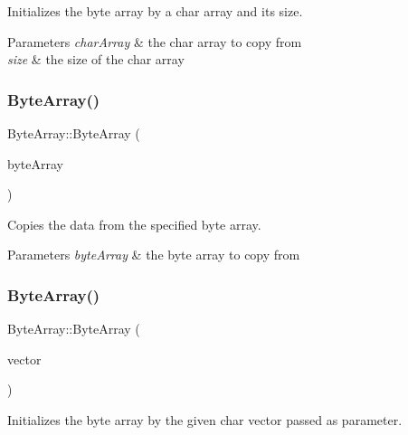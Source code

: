 Initializes the byte array by a char array and its size. 


\begin{DoxyParams}{Parameters}
{\em char\+Array} & the char array to copy from \\
\hline
{\em size} & the size of the char array \\
\hline
\end{DoxyParams}
\mbox{\label{class_byte_array_a6d8888512392eb9e671f56e434179fa1}} 
\subsubsection{\texorpdfstring{ByteArray()}{ByteArray()}\hspace{0.1cm}{\footnotesize\ttfamily [2/3]}}
{\footnotesize\ttfamily Byte\+Array\+::\+Byte\+Array (\begin{DoxyParamCaption}\item[{const \mbox{\hyperlink{class_byte_array}{Byte\+Array}} \&}]{byte\+Array }\end{DoxyParamCaption})}



Copies the data from the specified byte array. 


\begin{DoxyParams}{Parameters}
{\em byte\+Array} & the byte array to copy from \\
\hline
\end{DoxyParams}
\mbox{\label{class_byte_array_a94a65f2b5c6952713712e23a574b0295}} 
\subsubsection{\texorpdfstring{ByteArray()}{ByteArray()}\hspace{0.1cm}{\footnotesize\ttfamily [3/3]}}
{\footnotesize\ttfamily Byte\+Array\+::\+Byte\+Array (\begin{DoxyParamCaption}\item[{const \mbox{\hyperlink{class_a_vector}{A\+Vector}}$<$ char $>$ \&}]{vector }\end{DoxyParamCaption})}



Initializes the byte array by the given char vector passed as parameter. 


